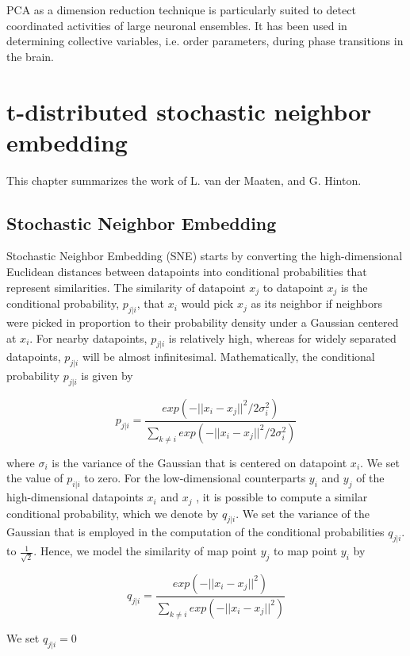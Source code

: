 \documentclass[12pt]{article}
\theoremstyle{plain}
\begin{document}
PCA as a dimension reduction technique is particularly suited to detect coordinated activities of large neuronal ensembles. It has been used in determining collective variables, i.e. order parameters, during phase transitions in the brain.\cite{wiki_pca}

\section{t-distributed stochastic neighbor embedding}

This chapter summarizes the work of L. van der Maaten, and G. Hinton\cite{sne}.
\subsection{Stochastic Neighbor Embedding}

Stochastic Neighbor Embedding (SNE) starts by converting the high-dimensional Euclidean distances between datapoints into conditional probabilities that represent similarities. The similarity of datapoint $x_j$ to datapoint $x_j$ is the conditional probability, $p_{j|i}$, that $x_i$ would pick $x_j$ as its neighbor if neighbors were picked in proportion to their probability density under a Gaussian centered at $x_i$. For nearby datapoints, $p_{j|i}$ is relatively high, whereas for widely separated datapoints, $p_{j|i}$ will be almost infinitesimal. Mathematically, the conditional probability $p_{j|i}$ is given by

\begin{equation}
p_{j|i} = \frac{exp(-||x_i-x_j||^2/2\sigma_i^2)}{\sum_{k \neq i}exp(-||x_i-x_j||^2/2\sigma_i^2)}
\end{equation}


where $\sigma_i$ is the variance of the Gaussian that is centered on datapoint $x_i$. We set the value of $p_{i|i}$ to zero. For the low-dimensional counterparts $y_i$ and $y_j$ of the high-dimensional datapoints $x_i$ and $x_j$ , it is possible to compute a similar conditional probability, which we denote by $q_{j|i}$. We set the variance of the Gaussian that is employed in the computation of the conditional probabilities $q_{j|i}$. to $\frac{1}{\sqrt{2}}$. Hence, we model the similarity of map point $y_j$ to map point $y_i$ by

\begin{equation}
q_{j|i} = \frac{exp(-||x_i-x_j||^2)}{\sum_{k \neq i}exp(-||x_i-x_j||^2)}
\end{equation}

We set $q_{j|i} = 0$
\\
\end{document}
